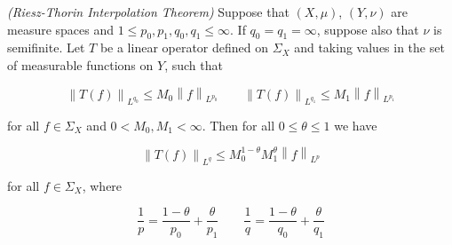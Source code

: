 \begin{mdframed}
	\begin{theorem}\emph{(Riesz-Thorin Interpolation Theorem)}
		Suppose that $(X,\mu)$, $(Y,\nu)$ are measure spaces and $1 \leqslant p_0,p_1,q_0,q_1 \leqslant \infty$. If $q_0 = q_1 = \infty$, suppose also that $\nu$ is semifinite. Let $T$ be a linear operator defined on $\Sigma_X$ and taking values in the set of measurable functions on $Y$, such that

		\begin{equation}
			\left\|T(f)\right\|_{L^{q_0}} \leqslant M_0\left\|f\right\|_{L^{p_0}} \qquad \left\|T(f)\right\|_{L^{q_1}} \leqslant M_1\left\|f\right\|_{L^{p_1}}
			\label{hyp:Lq0Lq1}
		\end{equation}

		for all $f \in \Sigma_X$ and $0 < M_0,M_1 < \infty$. Then for all $0 \leqslant \theta \leqslant 1$ we have

		\begin{equation}
			\left\|T(f)\right\|_{L^q} \leqslant M_0^{1 - \theta}M_1^\theta\left\|f\right\|_{L^p}
			\label{est:boundTf}
		\end{equation}

		for all $f \in \Sigma_X$, where

		\begin{equation*}
			\frac{1}{p} = \frac{1 - \theta}{p_0} + \frac{\theta}{p_1} \qquad \frac{1}{q} = \frac{1 - \theta}{q_0} + \frac{\theta}{q_1}
		\end{equation*}
		\label{thm:Riesz_Thorin}
	\end{theorem}
\end{mdframed}

